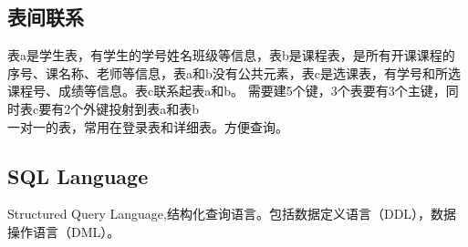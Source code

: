 \documentclass[UTF8]{article}
\begin{document}
\begin{comment}
    CREATE TABLE IF NOT EXISTS table_name(
        字段名称 字段类型 [可选：完整性约束条件]

    ) EIGEN=存储引擎, charset=编码方式

    数值类型：
        整形
        TINYINT (-128, 127) or (0, 255)，即8次幂，1字节
        SMALLINT 16次幂，2字节
        MEDIUMINT 24次幂，3字节
        INT (-2^31, 2^31-1) or (0, 2^24-1)，32次幂，4字节
        BIGINT 64次幂，8字节
        BOOL, BOOLEAN, 等价于TINYINT(1)，1字节

        浮点型
        FLOAT[(M,D)],M是总位数，D是小数位数，单精度浮点数精度大约7位小数。不设置时根据硬件条件设置
        取值范围(-3.4e38, -1.17e-38) & 0 & (1.175e-38, 3.4e38), 4字节
        DOUBLE[(M,D)],M是总位数，D是小数位数，取值范围(-1.79e308, -2.22e-308) & 0 & (2.22e-308, 1.79e308), 8字节
        DECIMAL[(M,D)],M是总位数，D是小数位数，类似DOUBLE，内部以字符串形式存储，字节M+2

        字符串类型
        CHAR(M), 定长串, M字节, M=[0,255]
        VAARCHAR(M), 变长串, 所占字节为L+1   小于M，M=[0,2^16-1],65536-1
        TINYTEXT, L < 2^8，L+1字节
        TEXT, L < 2^16，L+2字节
        MEDIUMTEXT, L < 2^24，L+3字节
        LONGTEXT, L < 2^32，L+4字节
        ENUM('VALUE1', 'VALUE2',...), 枚举，1或2字节，取决于枚举个数，最多2^16-1个值
        SET('VALUE1', 'VALUE2',...), 集合，1或2或3或4或8字节，取决于set成员个数，最多64个值

        日期类型:
        DATE, 3字节
        TIME, 3字节
        YEAR, 1字节
        DATETIME, 8字节
        TIMESTAMP 4字节

        二进制类型：
        不常用。
    

\end{comment}




\subsection{表间联系}
表a是学生表，有学生的学号姓名班级等信息，表b是课程表，是所有开课课程的序号、课名称、老师等信息，表a和b没有公共元素，表c是选课表，有学号和所选课程号、成绩等信息。表c联系起表a和b。
需要建5个键，3个表要有3个主键，同时表c要有2个外键投射到表a和表b\\
一对一的表，常用在登录表和详细表。方便查询。

\subsection{SQL Language}
Structured Query Language,结构化查询语言。包括数据定义语言（DDL），数据操作语言（DML）。
\end{document}
